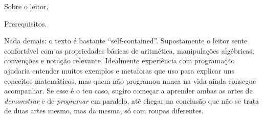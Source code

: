 
\endsecblah

\secblah Sobre o leitor.

\blah Prerequisitos.

Nada demais: o texto é bastante ``self-contained''.
Supostamente o leitor sente confortável com as propriedades básicas
de aritmética, manipulações algébricas, convenções e notação relevante.
Idealmente experiência com programação ajudaria entender muitos exemplos
e metaforas que uso para explicar uns conceitos matemáticos, mas quem
não programou nunca na vida ainda consegue acompanhar.
Se esse é o teu caso, sugiro começar a aprender ambas as artes de
\emph{demonstrar} e de \emph{programar} em paralelo, até chegar
na conclusão que não se trata de duas artes mesmo, mas da mesma,
só com roupas diferentes.


\endsecblah

\endchapblah
